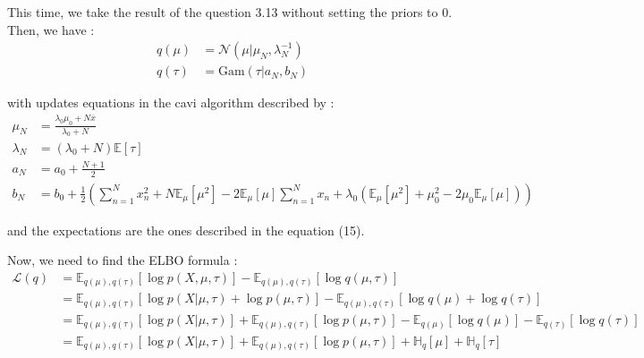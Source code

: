 \documentclass{article}
\begin{document}
This time, we take the result of the question 3.13 without setting the priors to 0.
Then, we have :
\begin{equation}
    \begin{split}
        q(\mu)  & = \mathcal{N}(\mu|\mu_N, \lambda_N^{-1}) \\
        q(\tau) & = \text{Gam}(\tau|a_N, b_N)
    \end{split}
\end{equation}

with updates equations in the cavi algorithm described by :
\begin{equation}
    \begin{split}
        \mu_N     & = \frac{\lambda_0\mu_0 + N\overline{x}}{\lambda_0 + N}                                                                                                                                                   \\
        \lambda_N & = (\lambda_0 + N)\mathbb{E}[\tau]                                                                                                                                                                        \\
        a_N       & = a_0 + \frac{N+1}{2}                                                                                                                                                                                    \\
        b_N       & = b_0 + \frac{1}{2}\left(\sum_{n=1}^{N}x_n^2 + N\mathbb{E}_\mu[\mu^2] - 2\mathbb{E}_\mu[\mu]\sum_{n=1}^{N}x_n + \lambda_0\left(\mathbb{E}_\mu[\mu^2] + \mu_0^2 - 2\mu_0\mathbb{E}_\mu[\mu]\right)\right)
    \end{split}
\end{equation}

and the expectations are the ones described in the equation (15).

Now, we need to find the ELBO formula :
\begin{equation}
    \begin{split}
        \mathcal{L}(q) & = \mathbb{E}_{q(\mu),q(\tau)}[\log p(X, \mu, \tau)] - \mathbb{E}_{q(\mu),q(\tau)}[\log q(\mu, \tau)]                                                                        \\
                       & = \mathbb{E}_{q(\mu),q(\tau)}[\log p(X|\mu, \tau) + \log p(\mu, \tau)] - \mathbb{E}_{q(\mu),q(\tau)}[\log q(\mu) + \log q(\tau)]                                            \\
                       & = \mathbb{E}_{q(\mu),q(\tau)}[\log p(X|\mu, \tau)] + \mathbb{E}_{q(\mu),q(\tau)}[\log p(\mu, \tau)] - \mathbb{E}_{q(\mu)}[\log q(\mu)] - \mathbb{E}_{q(\tau)}[\log q(\tau)] \\
                       & = \mathbb{E}_{q(\mu),q(\tau)}[\log p(X|\mu, \tau)] + \mathbb{E}_{q(\mu),q(\tau)}[\log p(\mu, \tau)] + \mathbb{H}_q[\mu] + \mathbb{H}_q[\tau]
    \end{split}
\end{equation}
\end{document}
